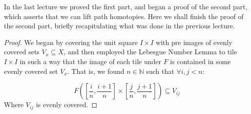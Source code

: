 \documentclass[11pt,reqno]{amsart}
\newcommand{\N}[0]{\mathbb{N}}
\theoremstyle{definition}
\begin{document}
    In the last lecture we proved the first part, and began a proof of the second part, which asserts that we can lift path homotopies. Here we shall finish the proof of the second part, briefly recapitulating what was done in the previous lecture.
    \begin{proof}
    We began by covering the unit square $I\times I$ with pre images of evenly covered sets $V_x\subseteq X$, and then employed the Lebesgue Number Lemma to tile $I\times I$ in such a way that the image of each tile under $F$ is contained in some evenly covered set $V_x$. That is, we found $n\in \N$ such that $\forall i,j<n$:
    
	\[F([\frac{i}{n},\frac{i+1}{n}]\times [\frac{j}{n},\frac{j+1}{n}])\subseteq V_{ij}
\]
Where $V_{ij}$ is evenly covered.

	\par


\end{proof}
\end{document}
